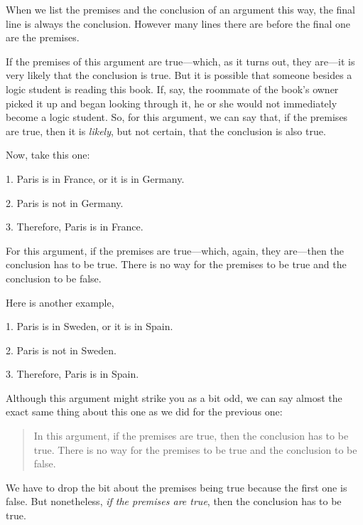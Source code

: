 \begin{notebox}
When we list the premises and the conclusion of an argument this way, the final line is always the conclusion. However many lines there are before the final one are the premises.
\end{notebox}

\noindent If the premises of this argument are true---which, as it turns out, they are---it is very likely that the conclusion is true. But it is possible that someone besides a logic student is reading this book. If, say, the roommate of the book's owner picked it up and began looking through it, he or she would not immediately become a logic student. So, for this argument, we can say that, if the premises are true, then it is \textit{likely}, but not certain, that the conclusion is also true. 

Now, take this one:
	\begin{earg}\label{valid-bananas}
		\item[1.] Paris is in France, or it is in Germany.
		\item[2.] Paris is not in Germany.
		\item[3.] Therefore, Paris is in France.
	\end{earg}
For this argument, if the premises are true---which, again, they are---then the conclusion has to be true. There is no way for the premises to be true and the conclusion to be false. 

Here is another example,

\noindent\begin{minipage}{0.99\textwidth}
	\begin{earg}
		\item[1.] Paris is in Sweden, or it is in Spain.
		\item[2.] Paris is not in Sweden. 
		\item[3.] Therefore, Paris is in Spain.
	\end{earg}
\smallskip
\end{minipage}

\noindent Although this argument might strike you as a bit odd, we can say almost the exact same thing about this one as we did for the previous one:
\begin{quote}
In this argument, if the premises are true, then the conclusion has to be true. There is no way for the premises to be true and the conclusion to be false. 
\end{quote}
We have to drop the bit about the premises being true because the first one is false. But nonetheless, \textit{if the premises are true}, then the conclusion has to be true. 

